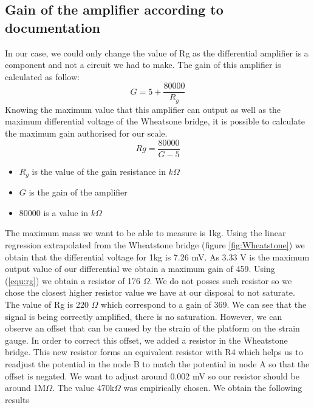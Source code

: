 \documentclass{article}[12pt]
\begin{document}
\subsection{Gain of the amplifier according to documentation}
In our case, we could only change the value of Rg as the differential amplifier is a component and not a circuit we had to make. The gain of this amplifier is calculated as follow:
\begin{equation}
    G=5+\dfrac{80000}{R_g}
\end{equation}
Knowing the maximum value that this amplifier can output as well as the maximum differential voltage of the Wheatsone bridge, it is possible to calculate the maximum gain authorised for our scale.
\begin{equation}
    Rg= \dfrac{80000}{G-5}
    \label{equ:rg}
\end{equation}
\begin{itemize}
    \item $R_g$ is the value of the gain resistance in $k\Omega$
    \item $G$ is the gain of the amplifier
    \item $80000$ is a value in $k\Omega$
\end{itemize}
The maximum mass we want to be able to measure is 1kg.
Using the linear regression extrapolated from the Wheatstone bridge (figure \ref{fig:Wheatstone}) we obtain that the differential voltage for 1kg is 7.26 mV.
As 3.33 V is the maximum output value of our differential we obtain a maximum gain of 459.
Using (\ref{equ:rg}) we obtain a resistor of 176 $\Omega$. We do not posses such resistor so we chose the closest higher resistor value we have at our disposal to not saturate.
The value of Rg is 220 $\Omega$ which correspond to a gain of 369.
We can see that the signal is being correctly amplified, there is no saturation. However, we can observe an offset that can be caused by the strain of the platform on the strain gauge.
In order to correct this offset, we added a resistor in the Wheatstone bridge.
This new resistor forms an equivalent resistor with R4 which helps us to readjust the potential in the node B to match the potential in node A so that the offset is negated.
We want to adjust around 0.002 mV so our resistor should be around 1M$\Omega$.
The value 470k$\Omega$ was empirically chosen.
We obtain the following results
\end{document}

